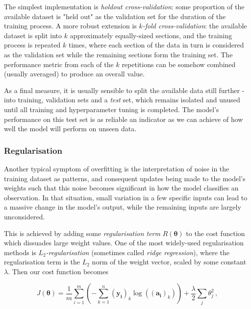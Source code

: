 \documentclass{article}[11pt]
\begin{document}
            The simplest implementation is \textit{holdout cross-validation}: some proportion of the available dataset is "held out" as the validation set for the duration of the training process. A more robust extension is \textit{$k$-fold cross-validation}: the available dataset is split into $k$ approximately equally-sized sections, and the training process is repeated $k$ times, where each section of the data in turn is considered as the validation set while the remaining sections form the training set. The performance metric from each of the $k$ repetitions can be somehow combined (usually averaged) to produce an overall value.
            
            As a final measure, it is usually sensible to split the available data still further - into training, validation sets and a \textit{test} set, which remains isolated and unused until all training and hyperparameter tuning is completed. The model's performance on this test set is as reliable an indicator as we can achieve of how well the model will perform on unseen data.
        
        
  
        \subsubsection{Regularisation}
            
            Another typical symptom of overfitting is the interpretation of noise in the training dataset as patterns, and consequent updates being made to the model's weights such that this noise becomes significant in how the model classifies an observation. In that situation, small variation in a few specific inputs can lead to a massive change in the model's output, while the remaining inputs are largely unconsidered.
            
            This is achieved by adding some \textit{regularisation term} $R(\boldsymbol{\theta})$ to the cost function which dissuades large weight values. One of the most widely-used regularisation methods is \textit{$L_2$-regularisation} (sometimes called \textit{ridge regression}), where the regularisation term is the $L_2$ norm of the weight vector, scaled by some constant $\lambda$. Then our cost function becomes
            
            $$
            J(\boldsymbol{\theta}) = \frac{1}{m} \sum_{i=1}^{m} \left( - \sum_{k=1}^{n} (\mathbf{y_i})_k \log(\mathbf{(a_i)}_k) \right) + \frac{\lambda}{2} \sum_j \theta_j^2 \,,
            $$
            
\end{document}
